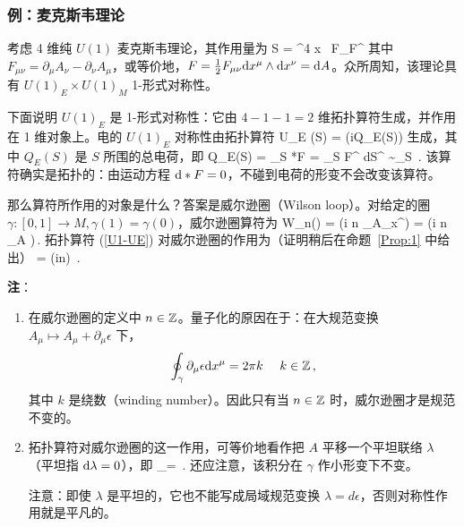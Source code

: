 \subsubsection{例：麦克斯韦理论}\label{subsec:Maxwell}

考虑 4 维纯 $U(1)$ 麦克斯韦理论，其作用量为
\be
S =  ^4 x \ F_{\mu\nu}F^{\mu\nu}
\ee
其中 $F_{\mu\nu} = \partial_\mu A_\nu- \partial_\nu A_\mu$，或等价地，$F = \frac{1}{2} F_{\mu\nu}{\rm d}x^\mu \wedge {\rm d}x^\nu = {\rm d}A $。众所周知，该理论具有 $U(1)_E \times U(1)_M$ 1-形式对称性。

下面说明 $U(1)_E$ 是 1-形式对称性：它由 $4-1-1=2$ 维拓扑算符生成，并作用在 1 维对象上。电的 $U(1)_E$ 对称性由拓扑算符
\be
\label{U1-UE}
U_E (S) = \exp(i\alpha Q_E(S))
\ee
生成，其中 $Q_E(S)$ 是 $S$ 所围的总电荷，即
\be
Q_E(S) = \int_S *F = \int_S F^{\mu\nu} {\rm d}S^{\rho\sigma} \sim  \int_S \cdot {}\,.
\ee
该算符确实是拓扑的：由运动方程 ${\rm d}*F = 0 $，不碰到电荷的形变不会改变该算符。

那么算符所作用的对象是什么？答案是威尔逊圈（Wilson loop）。对给定的圈 $\gamma:[0,1]\to M, \gamma(1)=\gamma(0)$，威尔逊圈算符为
\be 
W_n(\gamma) = \exp(i n  \oint_\gamma A_x^\mu )  = \exp(i n \int_\gamma A )\,. 
\ee
拓扑算符 (\ref{U1-UE}) 对威尔逊圈的作用为（证明稍后在命题~\ref{Prop:1} 中给出）
\be
{} = \exp(in\alpha {}) \,.
\ee

\textbf{注}：
\begin{enumerate}
\item 在威尔逊圈的定义中 $n\in {\mathbb{Z}}$。量子化的原因在于：在大规范变换 $A_\mu\mapsto A_\mu + \partial_\mu \epsilon$ 下，
    \[ \oint_\gamma \partial_\mu \epsilon {\rm d}x^\mu  = 2\pi k \quad \ k\in {\mathbb{Z}}\,, \]
    其中 $k$ 是绕数（winding number）。因此只有当 $n\in\mathbb{Z}$ 时，威尔逊圈才是规范不变的。
    
    \item 拓扑算符对威尔逊圈的这一作用，可等价地看作把 $A$ 平移一个平坦联络 $\lambda$（平坦指 ${\rm d}\lambda = 0$），即
    \be
    \oint_\gamma \lambda = \alpha {}\,.
    \label{Eq:intlambda}\ee
    还应注意，该积分在 $\gamma$ 作小形变下不变。

    注意：即使 $\lambda$ 是平坦的，它也不能写成局域规范变换 $\lambda=d\epsilon$，否则对称性作用就是平凡的。
    
\end{enumerate}

